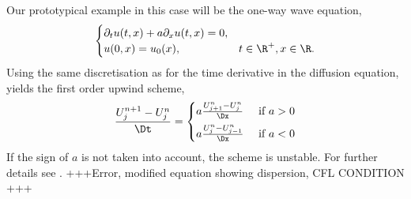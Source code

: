 %
%
%

%

Our prototypical example in this case will be the one-way wave equation,
\begin{equation}\label{eq:wave}\begin{cases}
\partial_t u(t,x) + a\partial_x u(t,x)=0,\\
u(0,x) = u_0(x),  &t\in\R^+, x\in\R.
\end{cases}\end{equation}
Using the same discretisation as for the time derivative in the diffusion equation, yields the first order upwind scheme,
\[
\frac{U^{n+1}_{j}-U^{n}_{j}}{\Dt} = \begin{cases} a\frac{U^{n}_{j+1}-U^{n}_{j}}{\Dx} & \text{ if } a>0\\[0.5em]
a\frac{U^{n}_{j}-U^{n}_{j-1}}{\Dx} & \text{ if } a<0\\
\end{cases}
\]
If the sign of \(a\) is not taken into account, the scheme is unstable. For further details see \cite{Hundsdorfer2007}.
+++Error, modified equation showing dispersion, CFL CONDITION +++





